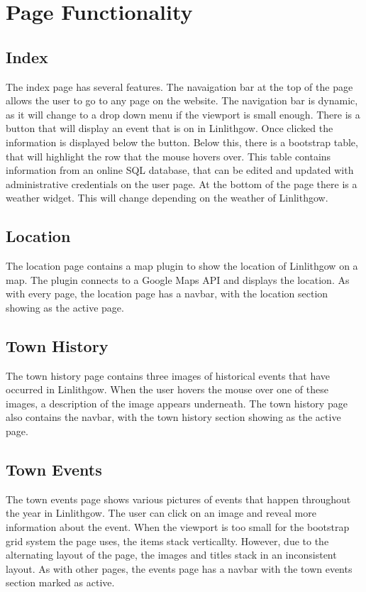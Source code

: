 \documentclass[12pt,a4paper]{article}
\begin{document}
	\clearpage

	\section{Page Functionality}
		\subsection{Index}
		The index page has several features. The navaigation bar at the top of the page allows the user to go to any page on the website. The navigation bar is dynamic, as it will change to a drop down menu if the viewport is small enough. There is a button that will display an event that is on in Linlithgow. Once clicked the information is displayed below the button. Below this, there is a bootstrap table, that will highlight the row that the mouse hovers over. This table contains information from an online SQL database, that can be edited and updated with administrative credentials on the user page. At the bottom of the page there is a weather widget. This will change depending on the weather of Linlithgow.

		\subsection{Location}
		The location page contains a map plugin to show the location of Linlithgow on a map. The plugin connects to a Google Maps API and displays the location. As with every page, the location page has a navbar, with the location section showing as the active page.

		\subsection{Town History}
		The town history page contains three images of historical events that have occurred in Linlithgow. When the user hovers the mouse over one of these images, a description of the image appears underneath. The town history page also contains the navbar, with the town history section showing as the active page.

		\subsection{Town Events}
		The town events page shows various pictures of events that happen throughout the year in Linlithgow. The user can click on an image and reveal more information about the event. When the viewport is too small for the bootstrap grid system the page uses, the items stack verticallty. However, due to the alternating layout of the page, the images and titles stack in an inconsistent layout. As with other pages, the events page has a navbar with the town events section marked as active.
\end{document}
